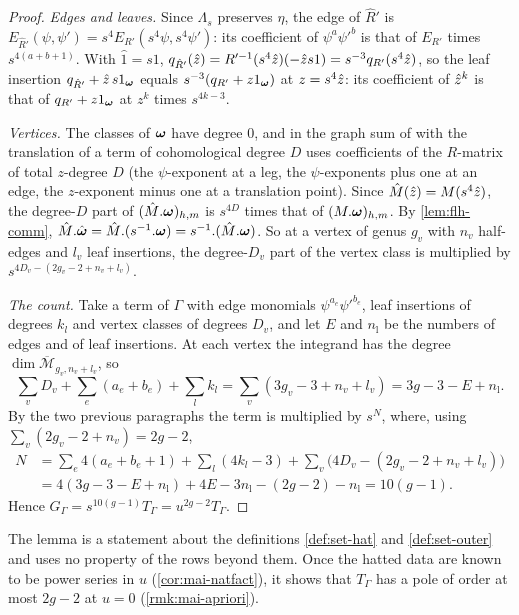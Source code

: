 \begin{proof}
\emph{Edges and leaves.} Since $\Lambda_s$ preserves $\eta$, the edge of $\hat R'$ is $E_{\hat R'}(\psi,\psi')=s^4E_{R'}(s^4\psi,s^4\psi')$: its coefficient of $\psi^a\psi'^b$ is that of $E_{R'}$ times $s^{4(a+b+1)}$. With $\hat1=s1$, $q_{\hat R'}(\hat{z})=R'^{-1}(s^4\hat{z})(-\hat{z} s1)=s^{-3}q_{R'}(s^4\hat{z})$, so the leaf insertion $q_{\hat R'}+\hat{z}\,s1_{\boldsymbol{\omega}}$ equals $s^{-3}(q_{R'}+z1_{\boldsymbol{\omega}})$ at $z=s^4\hat{z}$: its coefficient of $\hat{z}^k$ is that of $q_{R'}+z1_{\boldsymbol{\omega}}$ at $z^k$ times $s^{4k-3}$.

\emph{Vertices.} The classes of $\boldsymbol{\omega}$ have degree $0$, and in the graph sum of \cite[Def.~2.2]{PPZ15} with the translation of \cite[Def.~2.13]{PPZ15} a term of cohomological degree $D$ uses coefficients of the $R$-matrix of total $z$-degree $D$ (the $\psi$-exponent at a leg, the $\psi$-exponents plus one at an edge, the $z$-exponent minus one at a translation point). Since $\hat M(\hat{z})=M(s^4\hat{z})$, the degree-$D$ part of $(\hat M.\boldsymbol{\omega})_{h,m}$ is $s^{4D}$ times that of $(M.\boldsymbol{\omega})_{h,m}$. By \cref{lem:flh-comm}, $\hat M.\hat{\boldsymbol{\omega}}=\hat M.(s^{-1}.\boldsymbol{\omega})=s^{-1}.(\hat M.\boldsymbol{\omega})$. So at a vertex of genus $g_v$ with $n_v$ half-edges and $l_v$ leaf insertions, the degree-$D_v$ part of the vertex class is multiplied by $s^{4D_v-(2g_v-2+n_v+l_v)}$.

\emph{The count.} Take a term of $\Gamma$ with edge monomials $\psi^{a_e}\psi'^{b_e}$, leaf insertions of degrees $k_l$ and vertex classes of degrees $D_v$, and let $E$ and $n_{\mathrm l}$ be the numbers of edges and of leaf insertions. At each vertex the integrand has the degree $\dim\overline{\mathcal M}_{g_v,n_v+l_v}$, so
\[
\sum_vD_v+\sum_e(a_e+b_e)+\sum_lk_l=\sum_v(3g_v-3+n_v+l_v)=3g-3-E+n_{\mathrm l} .
\]
By the two previous paragraphs the term is multiplied by $s^N$, where, using $\sum_v(2g_v-2+n_v)=2g-2$,
\begin{align*}
N&=\sum_e4(a_e+b_e+1)+\sum_l(4k_l-3)+\sum_v\bigl(4D_v-(2g_v-2+n_v+l_v)\bigr)\\
&=4(3g-3-E+n_{\mathrm l})+4E-3n_{\mathrm l}-(2g-2)-n_{\mathrm l}=10(g-1).
\end{align*}
Hence $G_\Gamma=s^{10(g-1)}T_\Gamma=u^{2g-2}T_\Gamma$.
\end{proof}

The lemma is a statement about the definitions \cref{def:set-hat} and \cref{def:set-outer} and uses no property of the rows beyond them. Once the hatted data are known to be power series in $u$ (\cref{cor:mai-natfact}), it shows that $T_\Gamma$ has a pole of order at most $2g-2$ at $u=0$ (\cref{rmk:mai-apriori}).

